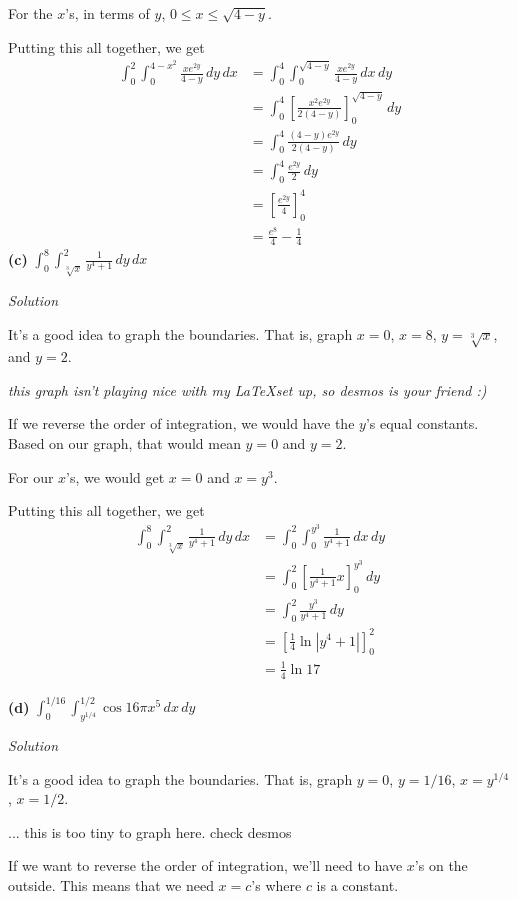 \documentclass{article}
\newcommand{\lrb}[1]{\left[ #1 \right]}
\newcommand{\Solution}{\textit{Solution}}
\begin{document}
For the $x$'s, in terms of $y$, $0\leq x \leq \sqrt{4-y}$.

Putting this all together, we get
\begin{align*}
    \int_0^2\int_0^{4-x^2}\frac{xe^{2y}}{4-y}\,dy\,dx&=\int_0^4\int_0^{\sqrt{4-y}}\frac{xe^{2y}}{4-y}\,dx\,dy\\
    &=\int_0^4\lrb{\frac{x^2e^{2y}}{2(4-y)}}_0^{\sqrt{4-y}}\,dy\\
    &=\int_0^4\frac{(4-y)e^{2y}}{2(4-y)}\,dy\\
    &=\int_0^4\frac{e^{2y}}{2}\,dy\tag{ok to ``cancel"}\\
    &=\lrb{\frac{e^{2y}}{4}}_0^4\\
    &=\boxed{\frac{e^8}{4}-\frac{1}{4}}
    \end{align*}
\textbf{(c)} $\displaystyle \int_0^8\int_{\sqrt[3]{x}}^2\frac{1}{y^4+1}\,dy\,dx$

\Solution

It's a good idea to graph the boundaries. That is, graph $x=0$, $x=8$, $y=\sqrt[3]{x}$, and $y=2$.

\textit{this graph isn't playing nice with my \LaTeX set up, so desmos is your friend :)}

If we reverse the order of integration, we would have the $y$'s equal constants. Based on our graph, that would mean $y=0$ and $y=2$. 

For our $x$'s, we would get $x=0$ and $x=y^3$.

Putting this all together, we get
\begin{align*}
    \int_0^8\int_{\sqrt[3]{x}}^2\frac{1}{y^4+1}\,dy\,dx&=\int_0^2\int_0^{y^3}\frac{1}{y^4+1}\,dx\,dy\\
    &=\int_0^2\lrb{\frac{1}{y^4+1}x}_0^{y^3}\,dy\\
    &=\int_0^2 \frac{y^3}{y^4+1}\,dy\\
    &=\lrb{\frac{1}{4}\ln\left|y^4+1\right|}_0^2\tag{u-sub with $u=y^4$}\\
    &=\boxed{\frac{1}{4}\ln 17}
\end{align*}

\textbf{(d)} $\displaystyle \int_0^{1/16}\int_{y^{1/4}}^{1/2}\cos 16\pi x^5\,dx\,dy$

\Solution

It's a good idea to graph the boundaries. That is, graph $y=0$, $y=1/16$, $x=y^{1/4}$, $x=1/2$.

... this is too tiny to graph here. check desmos

If we want to reverse the order of integration, we'll need to have $x$'s on the outside. This means that we need $x=c$'s where $c$ is a constant.
\end{document}
